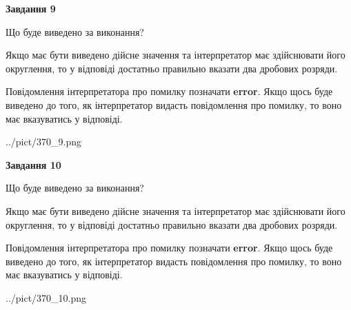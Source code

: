 \documentclass[12pt, ukrainian]{article}
\begin{document}
{\begin {Large}
{\begin {center}\textbf{Завдання 9}\end {center}}\par
Що буде виведено за виконання? \par

Якщо має бути виведено дійсне значення та інтерпретатор має здійснювати його округлення, 
то у відповіді достатньо правильно вказати два дробових розряди.

Повідомлення інтерпретатора про помилку позначати \textbf{error}.
Якщо щось буде виведено до того, як інтерпретатор видасть повідомлення про помилку, 
то воно має вказуватись у відповіді. \par

\begin{center}
	{../pict/370_9.png}
\end{center}
\newpage

{\begin {center}\textbf{Завдання 10}\end {center}}\par
Що буде виведено за виконання? \par

Якщо має бути виведено дійсне значення та інтерпретатор має здійснювати його округлення, 
то у відповіді достатньо правильно вказати два дробових розряди.

Повідомлення інтерпретатора про помилку позначати \textbf{error}.
Якщо щось буде виведено до того, як інтерпретатор видасть повідомлення про помилку, 
то воно має вказуватись у відповіді. \par

\begin{center}
	{../pict/370_10.png}
\end{center}
\newpage

\end {Large}}
\end{document}
